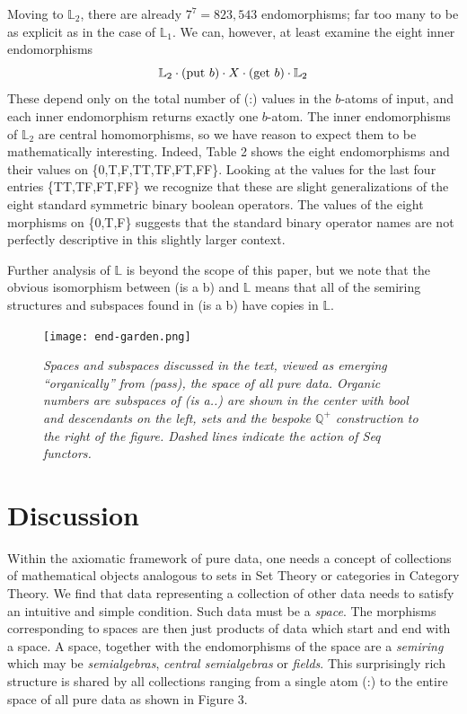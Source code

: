 \documentclass[11pt]{article}
\begin{document}
    Moving to ${\mathbb L}_2$, there are already $7^7=823,543$ endomorphisms; far too many to be as explicit as in the case of ${\mathbb L}_1$.  
 We can, however, at least examine the eight inner endomorphisms 
 \begin{equation}
 {\mathbb L}_2\cdot ({\rm put}\ b)\cdot X \cdot ({\rm get}\ b) \cdot {\mathbb L}_2
 \end{equation}
These depend only on the total number of (:) values in the $b$-atoms of input, and each 
inner endomorphism returns exactly one $b$-atom.  
The inner endomorphisms of ${\mathbb L}_2$ are central homomorphisms, so we have reason to expect them to be
mathematically interesting.   
Indeed, Table 2 shows the eight endomorphisms and their values on \{0,T,F,TT,TF,FT,FF\}.  Looking at the values for the last four entries \{TT,TF,FT,FF\} 
we recognize that these are slight generalizations of the eight standard symmetric binary boolean operators.  The values of the eight morphisms 
on \{0,T,F\} suggests that the standard binary operator names are not perfectly descriptive in this slightly larger context.  

    Further analysis of ${\mathbb L}$ is beyond the scope of this paper, but we note that the obvious isomorphism between (is a b) and ${\mathbb L}$ 
means that all of the semiring structures and subspaces found in (is a b) have copies in ${\mathbb L}$.  

\begin{figure}[h]
\centering
\texttt{[image: end-garden.png]}
\caption{{\it Spaces and subspaces discussed in the text, viewed as emerging ``organically'' from (pass), the space of all pure data. 
Organic numbers are subspaces of (is a..) are shown in the center with bool and descendants on the left, sets and the bespoke
${\mathbb Q}^+$ construction to the right of the figure.  Dashed lines indicate the action of Seq functors.}}
\end{figure}

\section{Discussion} 

      Within the axiomatic framework of pure data, one needs a concept of collections of mathematical objects analogous to sets in Set Theory or categories 
in Category Theory.   We find that data representing a collection of other data needs to satisfy an intuitive and simple condition.  Such data must 
be a {\it space}.  The morphisms corresponding to spaces are then just products of data which start and end with a space.  
A space, together with the endomorphisms of the space are a {\it semiring} which may be {\it semialgebras}, {\it central semialgebras} or 
{\it fields}.  This surprisingly rich structure is shared by all collections ranging from a single atom (:) to the entire space of all pure data as shown 
in Figure 3.  
\end{document}
